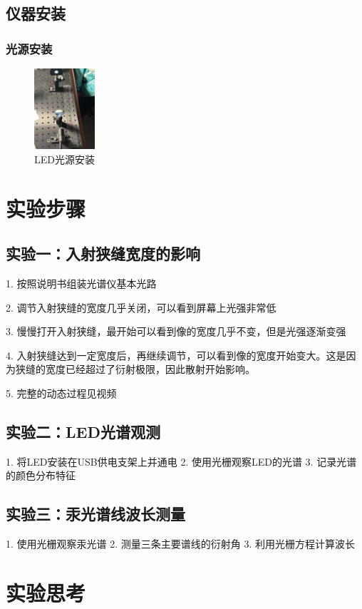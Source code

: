 \documentclass{ctexart}
\begin{document}
\subsection{仪器安装}
\subsubsection{光源安装}
\begin{figure}[htbp]
    \centering
    \includegraphics[width=0.2\textwidth,height=0.3\textwidth]{pictures/微信图片_20241107162037.jpg}
    \caption{LED光源安装}
\end{figure}
\section{实验步骤}

\subsection{实验一：入射狭缝宽度的影响}
1. 按照说明书组装光谱仪基本光路

2. 调节入射狭缝的宽度几乎关闭，可以看到屏幕上光强非常低

3. 慢慢打开入射狭缝，最开始可以看到像的宽度几乎不变，但是光强逐渐变强

4. 入射狭缝达到一定宽度后，再继续调节，可以看到像的宽度开始变大。这是因为狭缝的宽度已经超过了衍射极限，因此散射开始影响。

5. 完整的动态过程见视频
\subsection{实验二：LED光谱观测}
1. 将LED安装在USB供电支架上并通电
2. 使用光栅观察LED的光谱
3. 记录光谱的颜色分布特征

\subsection{实验三：汞光谱线波长测量}
1. 使用光栅观察汞光谱
2. 测量三条主要谱线的衍射角
3. 利用光栅方程计算波长

\section{实验思考}
\end{document}
